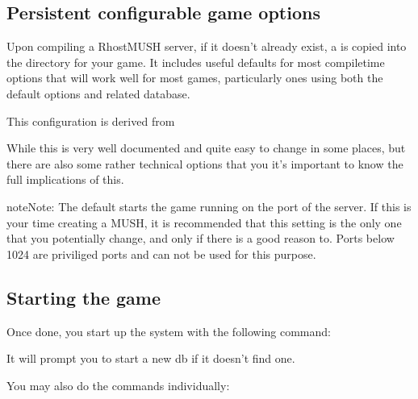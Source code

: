 \documentclass[letterpaper,10pt,english]{sphinxmanual}
\begin{document}
\subsection{Persistent configurable game options}
\label{\detokenize{install:persistent-configurable-game-options}}
\sphinxAtStartPar
Upon compiling a RhostMUSH server, if it doesn’t already exist, a
 is copied into the  directory for your game. It
includes useful defaults for most compile\sphinxhyphen{}time options that will work well for
most games, particularly ones using both the default  options and
related database.

\sphinxAtStartPar
This configuration is derived from 

\sphinxAtStartPar
While this  is very well documented and quite easy to change
in some places, but there are also some rather technical options that you it’s
important to know the full implications of this.

\begin{sphinxadmonition}{note}{Note:}
\sphinxAtStartPar
The default  starts the game running on the port  of
the server. If this is your time creating a MUSH, it is recommended that this
setting is the only one that you potentially change, and only if there is a
good reason to. Ports below 1024 are priviliged ports and can not be used for
this purpose.
\end{sphinxadmonition}


\subsection{Starting the game}
\label{\detokenize{install:starting-the-game}}
\sphinxAtStartPar
Once done, you start up the system with the following command:

\begin{sphinxVerbatim}[commandchars=\\\{\}]
\end{sphinxVerbatim}

\sphinxAtStartPar
It will prompt you to start a new db if it doesn’t find one.

\sphinxAtStartPar
You may also do the commands individually:
\end{document}
